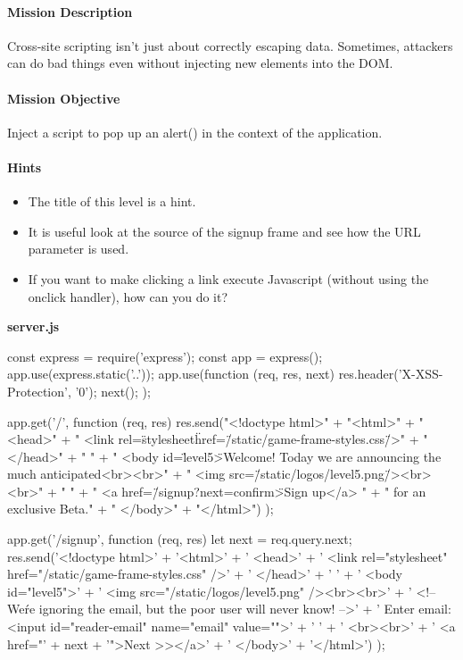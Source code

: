 \begin{Exercise}[label={websec-xss-game}]
\paragraph{Mission Description}
Cross-site scripting isn't just about correctly escaping data. Sometimes, attackers can do bad things even without injecting new elements into the DOM.
	
\paragraph{Mission Objective}
Inject a script to pop up an alert() in the context of the application.

\paragraph{Hints}
\begin{itemize}
\item The title of this level is a hint.
\item It is useful look at the source of the signup frame and see how the URL parameter is used.
\item If you want to make clicking a link execute Javascript (without using the onclick handler), how can you do it?
\end{itemize}

\textbf{server.js}
\begin{js}
const express = require('express');
const app = express();
app.use(express.static('..'));
app.use(function (req, res, next) {
  res.header('X-XSS-Protection', '0');
  next();
});

app.get('/', function (req, res) {
    res.send("<!doctype html>\n" +
    "<html>\n" +
    "  <head>\n" +
    "    <link rel=\"stylesheet\" href=\"/static/game-frame-styles.css\" />\n" +
    "  </head>\n" +
    " \n" + "  <body id=\"level5\">\n    Welcome! Today we are announcing the much anticipated<br><br>\n" +
    "    <img src=\"/static/logos/level5.png\" /><br><br>\n" +
    " \n" +
    "    <a href=\"/signup?next=confirm\">Sign up</a> \n" +
    "    for an exclusive Beta.\n" +
    "  </body>\n" +
    "</html>")
});

app.get('/signup', function (req, res) {
let next = req.query.next;
  res.send('<!doctype html>\n' +
  '<html>\n' +
  '  <head>\n' +
  '    <link rel="stylesheet" href="/static/game-frame-styles.css" />\n' +
  '  </head>\n' +
  ' \n' +
  '  <body id="level5">\n' +
  '    <img src="/static/logos/level5.png" /><br><br>\n' +
  '    <!-- We\'re ignoring the email, but the poor user will never know! -->\n' +
  '    Enter email: <input id="reader-email" name="email" value="">\n' +
  ' \n' +
  '    <br><br>\n' +
  '    <a href="' + next + '">Next >></a>\n' +
  '  </body>\n' +
  '</html>')
});


\end{js}
\end{Exercise}
